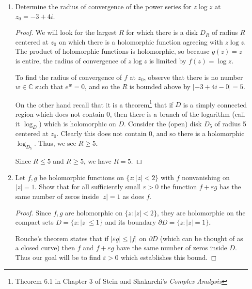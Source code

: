 \documentclass{article}
\renewcommand{\epsilon}{\varepsilon}
\begin{document}
\begin{enumerate}
\begin{proof}
		Recall that the integral we \textit{wanted} to compute was the real part of the above integral, but since the integral is real, the real part is the whole integral, and so
		
		\[\int_{-\infty}^\infty \frac{\cos x}{1+x^2} dx = \frac{\pi}{e}\]
		
	\end{proof}
	
	
	\item Determine the radius of convergence of the power series for $z \log z$ at $z_0 = -3 + 4i$.
	
	\begin{proof}
		We will look for the largest $R$ for which there is a disk $D_R$ of radius $R$ centered at $z_0$ on which there is a holomorphic function agreeing with $z \log z$.
		The product of holomorphic functions is holomorphic, so because $g(z) = z$ is entire, the radius of convergence of $z \log z$ is limited by $f(z) = \log z$. 
		
		To find the radius of convergence of $f$ at $z_0$, observe that there is no number $w \in \mathbb{C}$ such that $e^w = 0$, and so the $R$ is bounded above by $|-3 + 4i - 0| = 5$.		
		
		On the other hand recall that it is a theorem\footnote{Theorem 6.1 in Chapter 3 of Stein and Shakarchi's \textit{Complex Analysis}} that if $D$ is a simply connected region which does not contain $0$, then there is a branch of the logarithm (call it $\log_D$) which is holomorphic on $D$. Consider the (open) disk $D_5$ of radius 5 centered at $z_0$. Clearly this does not contain $0$, and so there is a holomorphic $\log_{D_5}$. Thus, we see $R \geq 5$. 
		
		Since $R \leq 5$ and $R \geq 5$, we have $R = 5$.
	\end{proof}
	

	\item Let $f,g$ be holomorphic functions on $\{z : |z| < 2\}$ with $f$ nonvanishing on $|z| = 1$. Show that for all sufficiently small $\epsilon>0$ the function $f+ \epsilon g$ has the same number of zeros inside $|z| = 1$ as does $f$. 
	
	\begin{proof}
		Since $f,g$ are holomorphic on $\{ z: |z| < 2\}$, they are holomorphic on the compact sets $D = \{z : |z | \leq 1\}$ and its boundary $\partial D =\{z : |z| = 1\}$.
		
		Rouche's theorem states that if $|\epsilon g| \leq |f|$ on $\partial D$ (which can be thought of as a closed curve) then $f$ and $f+ \epsilon g$ have the same number of zeros inside $D$. 
		Thus our goal will be to find $\epsilon > 0$ which establishes this bound.
		

\end{proof}
\end{enumerate}
\end{document}
